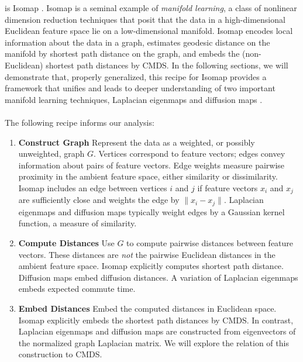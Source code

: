 \documentclass[10pt,twocolumn]{article}
\numberwithin{equation}{section}
\begin{document}
is Isomap
\cite{tenebaum00:_global_geomet_framew_nonlin_dimen_reduc}.
Isomap is a seminal example of {\em manifold learning},
a class of nonlinear dimension reduction techniques that posit
that the data in a high-dimensional Euclidean feature space lie on a 
low-dimensional manifold.  Isomap encodes local information about
the data in a graph, estimates geodesic distance on the manifold by 
shortest path distance on the graph, and embeds the (non-Euclidean)
shortest path distances by CMDS.
In the following sections, we will demonstrate that, properly generalized, 
this recipe for Isomap provides a framework that unifies and leads to 
deeper understanding of two important manifold learning techniques,
Laplacian eigenmaps \cite{belkin03:_laplac} and
diffusion maps \cite{coifman06:_diffus_maps}. \\ \\
%
\noindent
The following recipe informs our analysis:
%
\begin{enumerate}
\item {\bf Construct Graph} 
Represent the data as a weighted, or possibly unweighted,
  graph $G$. Vertices correspond to feature vectors; edges
  convey information about pairs of feature vectors. Edge
  weights measure pairwise proximity in the ambient feature space,
  either similarity or dissimilarity. Isomap includes an edge
  between vertices $i$ and $j$ if feature vectors $x_i$ and $x_j$ are
  sufficiently close and weights the
  edge by $\| x_i-x_j \|$.  Laplacian
  eigenmaps and diffusion maps typically weight edges by a Gaussian
  kernel function, a measure of similarity.
  
\item {\bf Compute Distances} Use $G$ to compute pairwise distances between
feature vectors.  These distances are {\em not}\/ the pairwise Euclidean
distances in the ambient feature space.  Isomap explicitly computes
  shortest path distance.  Diffusion maps embed diffusion
  distances.  A variation of Laplacian eigenmaps embeds expected
  commute time.
  
\item {\bf Embed Distances}  Embed the computed distances in Euclidean space.
Isomap explicitly embeds the shortest path distances by CMDS.  In contrast,
Laplacian eigenmaps and diffusion maps are constructed from
  eigenvectors of the normalized graph Laplacian matrix.  We will explore
  the relation of this construction to CMDS. 
  
\end{enumerate}
%
\noindent
\end{document}
